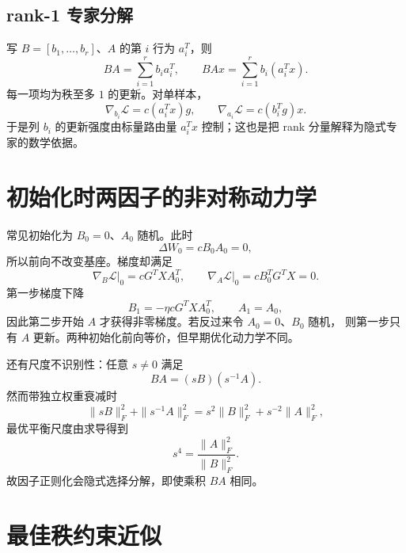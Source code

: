 \documentclass[11pt]{article}
\numberwithin{equation}{section}
\newcommand{\1}{\mathbf{1}}
\newcommand{\cL}{\mathcal{L}}
\begin{document}
\subsection{rank-1 专家分解}

写 $B=[b_1,\ldots,b_r]$、$A$ 的第 $i$ 行为 $a_i^T$，则
\begin{equation}
 BA=\sum_{i=1}^{r}b_i a_i^T,
 \qquad BAx=\sum_{i=1}^{r}b_i(a_i^Tx).
\end{equation}
每一项均为秩至多 $1$ 的更新。对单样本，
\begin{equation}
 \nabla_{b_i}\cL=c(a_i^Tx)g,\qquad
 \nabla_{a_i}\cL=c(b_i^Tg)x.
\end{equation}
于是列 $b_i$ 的更新强度由标量路由量 $a_i^Tx$ 控制；这也是把 rank 分量解释为隐式专家的数学依据。

\section{初始化时两因子的非对称动力学}

常见初始化为 $B_0=0$、$A_0$ 随机。此时
\begin{equation}
 \Delta W_0=cB_0A_0=0,
\end{equation}
所以前向不改变基座。梯度却满足
\begin{equation}
 \nabla_B\cL\big|_{0}=cG^TXA_0^T,\qquad
 \nabla_A\cL\big|_{0}=cB_0^TG^TX=0.
\end{equation}
第一步梯度下降
\begin{equation}
 B_1=-\eta cG^TXA_0^T,\qquad A_1=A_0,
\end{equation}
因此第二步开始 $A$ 才获得非零梯度。若反过来令 $A_0=0$、$B_0$ 随机，
则第一步只有 $A$ 更新。两种初始化前向等价，但早期优化动力学不同。

还有尺度不识别性：任意 $s\ne0$ 满足
\begin{equation}
 BA=(sB)(s^{-1}A).
\end{equation}
然而带独立权重衰减时
\begin{equation}
 \|sB\|_F^2+\|s^{-1}A\|_F^2
 =s^2\|B\|_F^2+s^{-2}\|A\|_F^2,
\end{equation}
最优平衡尺度由求导得到
\begin{equation}
 s^4=\frac{\|A\|_F^2}{\|B\|_F^2}.
\end{equation}
故因子正则化会隐式选择分解，即使乘积 $BA$ 相同。

\section{最佳秩约束近似}
\end{document}
